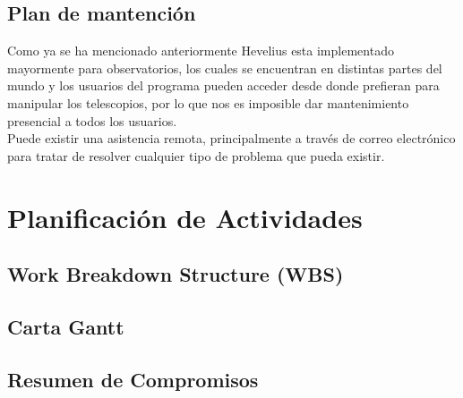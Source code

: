 \documentclass[letterpaper,spanish,10pt]{article}
\begin{document}
\subsection{Plan de mantenci\'on}
Como ya se ha mencionado anteriormente Hevelius esta implementado mayormente 
para observatorios, los cuales se encuentran en distintas partes del mundo y 
los usuarios del programa pueden acceder desde donde prefieran para manipular 
los telescopios, por lo que nos es imposible dar mantenimiento presencial a 
todos los usuarios.\\

Puede existir una asistencia remota, principalmente a trav\'es de correo 
electr\'onico para tratar de resolver cualquier tipo de problema que pueda 
existir.



\newpage
\section{Planificaci\'on de Actividades} %
\subsection{Work Breakdown Structure (WBS)}



\subsection{Carta Gantt}



\subsection{Resumen de Compromisos}
\end{document}
